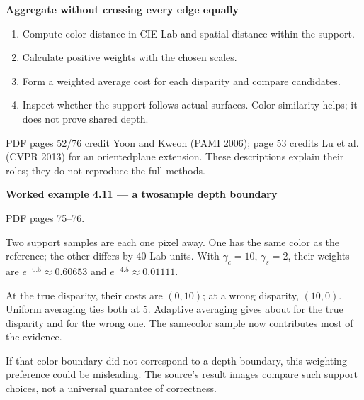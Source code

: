 \documentclass[letterpaper,11pt,english,openany,oneside]{jupyterBook}
\begin{document}
\begin{TextbookBox}
\textbf{Aggregate without crossing every edge equally}\par\smallskip
\begin{enumerate}
%
\item {}
\sphinxAtStartPar
Compute color distance in CIE Lab and spatial distance within the support.

\item {}
\sphinxAtStartPar
Calculate positive weights with the chosen scales.

\item {}
\sphinxAtStartPar
Form a weighted average cost for each disparity and compare candidates.

\item {}
\sphinxAtStartPar
Inspect whether the support follows actual surfaces. Color similarity helps; it does not prove shared depth.

\end{enumerate}

\sphinxAtStartPar
PDF pages 52/76 credit Yoon and Kweon (PAMI 2006); page 53 credits Lu et al. (CVPR 2013) for an oriented\sphinxhyphen{}plane extension. These descriptions explain their roles; they do not reproduce the full methods.

\end{TextbookBox}
\label{\detokenize{lectures/lecture04/matching:ex-lec04-adaptive}}
\begin{TextbookBox}
\textbf{Worked example 4.11 — a two\sphinxhyphen{}sample depth boundary}\par\smallskip

\sphinxAtStartPar
{} PDF pages 75–76.

\sphinxAtStartPar
Two support samples are each one pixel away. One has the same color as the reference; the other differs by 40 Lab units. With \(\gamma_c=10\), \(\gamma_s=2\), their weights are \(e^{-0.5}\approx0.60653\) and \(e^{-4.5}\approx0.01111\).

\sphinxAtStartPar
At the true disparity, their costs are \((0,10)\); at a wrong disparity, \((10,0)\). Uniform averaging ties both at 5. Adaptive averaging gives about  for the true disparity and  for the wrong one. The same\sphinxhyphen{}color sample now contributes most of the evidence.

\sphinxAtStartPar
If that color boundary did not correspond to a depth boundary, this weighting preference could be misleading. The source’s result images compare such support choices, not a universal guarantee of correctness.

\end{TextbookBox}
\end{document}
